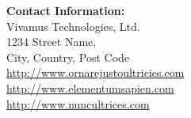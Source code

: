 \documentclass[10pt]{article} %
\begin{document}
\begin{minipage}[t]{.30\linewidth}
  \centering
  \begin{minipage}[t]{.95\linewidth}
    \textbf{Contact Information:}\\
    Vivamus Technologies, Ltd.\\
    1234 Street Name,\\
    City, Country, Post Code\\
    \href{http://www.example.com}{http://www.ornarejustoultricies.com}\\
    \href{http://www.example.com}{http://www.elementumsapien.com}\\
    \href{http://www.example.com}{http://www.nuncultrices.com}
  \end{minipage}


\end{minipage} %

\end{document}
